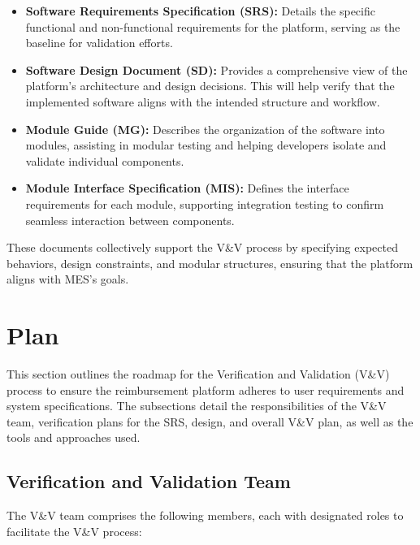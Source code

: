 \documentclass[12pt, titlepage]{article}
\begin{document}
\begin{itemize}
    \item \textbf{Software Requirements Specification (SRS):} Details the specific functional and non-functional requirements for the platform, serving as the baseline for validation efforts.
    \item \textbf{Software Design Document (SD):} Provides a comprehensive view of the platform's architecture and design decisions. This will help verify that the implemented software aligns with the intended structure and workflow.
    \item \textbf{Module Guide (MG):} Describes the organization of the software into modules, assisting in modular testing and helping developers isolate and validate individual components.
    \item \textbf{Module Interface Specification (MIS):} Defines the interface requirements for each module, supporting integration testing to confirm seamless interaction between components.
\end{itemize}

These documents collectively support the V\&V process by specifying expected behaviors, design constraints, and modular structures, ensuring that the platform aligns with MES's goals.


\section{Plan}
This section outlines the roadmap for the Verification and Validation (V\&V) process to ensure the reimbursement platform adheres to user requirements and system specifications. The subsections detail the responsibilities of the V\&V team, verification plans for the SRS, design, and overall V\&V plan, as well as the tools and approaches used.

\subsection{Verification and Validation Team}
The V\&V team comprises the following members, each with designated roles to facilitate the V\&V process:
\end{document}
